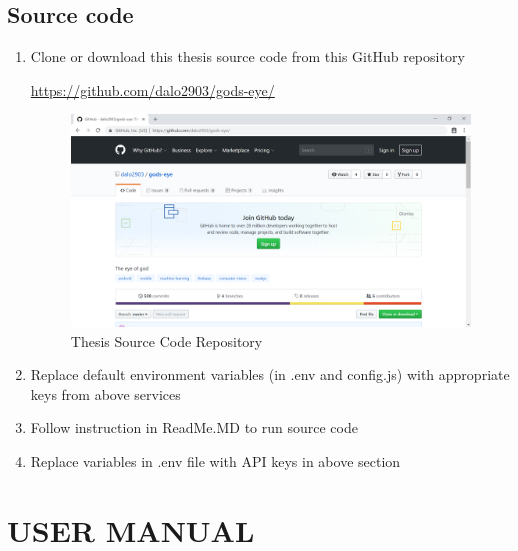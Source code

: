 \section{Source code}
\begin{enumerate}
\item Clone or download this thesis source code from this GitHub repository 

\href{https://github.com/dalo2903/gods-eye/}{https://github.com/dalo2903/gods-eye/}
\begin{center}
    \begin{figure}[H]
    \centering
    \includegraphics[width=1\columnwidth]{images/appendixA/GodsEye-GitHub.PNG}
    \caption{Thesis Source Code Repository}
    \end{figure}
\end{center}
\item Replace default environment variables (in .env and config.js) with appropriate keys from above services
\item Follow instruction in ReadMe.MD to run source code
\item Replace variables in .env file with API keys in above section
\end{enumerate}

\chapter{USER MANUAL}
